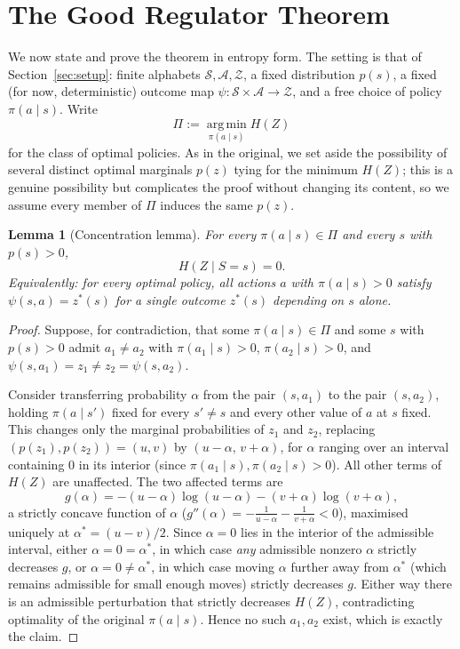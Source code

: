 \documentclass[11pt]{article}
\newtheorem{lemma}{Lemma}
\theoremstyle{definition}
\theoremstyle{remark}
\newcommand{\Scal}{\mathcal{S}}
\newcommand{\Acal}{\mathcal{A}}
\newcommand{\Zcal}{\mathcal{Z}}
\begin{document}
\section{The Good Regulator Theorem}
\label{sec:theorem}

We now state and prove the theorem in entropy form. The setting is that of
Section~\ref{sec:setup}: finite alphabets $\Scal,\Acal,\Zcal$, a fixed
distribution $p(s)$, a fixed (for now, deterministic) outcome map
$\psi:\Scal\times\Acal\to\Zcal$, and a free choice of policy $\pi(a\mid
s)$. Write
\[
\Pi := \operatorname*{arg\,min}_{\pi(a\mid s)} H(Z)
\]
for the class of optimal policies. As in the original, we set aside the
possibility of several distinct optimal marginals $p(z)$ tying for the
minimum $H(Z)$; this is a genuine possibility but complicates the proof
without changing its content, so we assume every member of $\Pi$ induces
the same $p(z)$.

\begin{lemma}[Concentration lemma]
\label{lem:concentration}
For every $\pi(a\mid s)\in\Pi$ and every $s$ with $p(s)>0$,
\[
H(Z\mid S=s) = 0.
\]
Equivalently: for every optimal policy, all actions $a$ with
$\pi(a\mid s)>0$ satisfy $\psi(s,a)=z^\ast(s)$ for a single outcome
$z^\ast(s)$ depending on $s$ alone.
\end{lemma}

\begin{proof}
Suppose, for contradiction, that some $\pi(a\mid s)\in\Pi$ and some $s$
with $p(s)>0$ admit $a_1\ne a_2$ with $\pi(a_1\mid s)>0$, $\pi(a_2\mid
s)>0$, and $\psi(s,a_1)=z_1\ne z_2=\psi(s,a_2)$.

Consider transferring probability $\alpha$ from the pair $(s,a_1)$ to the
pair $(s,a_2)$, holding $\pi(a\mid s')$ fixed for every $s'\ne s$ and every
other value of $a$ at $s$ fixed. This changes only the marginal
probabilities of $z_1$ and $z_2$, replacing $(p(z_1),p(z_2))=(u,v)$ by
$(u-\alpha,\,v+\alpha)$, for $\alpha$ ranging over an interval containing
$0$ in its interior (since $\pi(a_1\mid s),\pi(a_2\mid s)>0$). All other
terms of $H(Z)$ are unaffected. The two affected terms are
\[
g(\alpha) = -(u-\alpha)\log(u-\alpha) - (v+\alpha)\log(v+\alpha),
\]
a strictly concave function of $\alpha$
($g''(\alpha) = -\tfrac{1}{u-\alpha}-\tfrac{1}{v+\alpha} < 0$), maximised
uniquely at $\alpha^\ast = (u-v)/2$. Since $\alpha=0$ lies in the interior
of the admissible interval, either $\alpha=0=\alpha^\ast$, in which case
\emph{any} admissible nonzero $\alpha$ strictly decreases $g$, or
$\alpha=0\ne\alpha^\ast$, in which case moving $\alpha$ further away from
$\alpha^\ast$ (which remains admissible for small enough moves) strictly
decreases $g$. Either way there is an admissible perturbation that
strictly decreases $H(Z)$, contradicting optimality of the original
$\pi(a\mid s)$. Hence no such $a_1,a_2$ exist, which is exactly the claim.
\end{proof}
\end{document}
